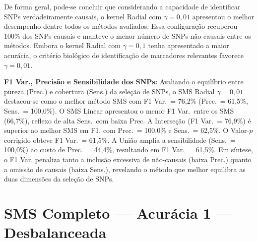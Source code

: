 \documentclass[
    12pt,
    a4paper,
    oneside,
    english,
    french,
    spanish,
    brazil
    ]{abntex2}
\newcommand{\novo}[1]{\textcolor{corNova}{#1}}
\begin{document}
De forma geral, pode-se concluir que considerando a capacidade de identificar SNPs verdadeiramente causais, o kernel Radial com $\gamma = 0{,}01$ apresentou o melhor desempenho dentre todos os métodos avaliados. Essa configuração recuperou 100\% dos SNPs causais e manteve o menor número de SNPs não causais entre os métodos. Embora o kernel Radial com $\gamma = 0{,}1$ tenha apresentado a maior acurácia, o critério biológico de identificação de marcadores relevantes favorece $\gamma = 0{,}01$.


\novo{\textbf{F1 Var., Precisão e Sensibilidade dos SNPs:} Avaliando o equilíbrio entre pureza (Prec.) e cobertura (Sens.) da seleção de SNPs, o SMS Radial $\gamma=0{,}01$ destacou-se como o melhor método SMS com F1 Var.\ = 76,2\% (Prec.\ = 61,5\%, Sens.\ = 100,0\%). O SMS Linear apresentou o menor F1 Var.\ entre os SMS (66,7\%), reflexo de alta Sens.\ com baixa Prec. A Interseção (F1 Var.\ = 76,9\%) é superior ao melhor SMS em F1, com Prec.\ = 100,0\% e Sens.\ = 62,5\%. O Valor-$p$ corrigido obteve F1 Var.\ = 61,5\%. A União amplia a sensibilidade (Sens.\ = 100,0\%) ao custo de Prec.\ = 44,4\%, resultando em F1 Var.\ = 61,5\%. Em síntese, o F1 Var. penaliza tanto a inclusão excessiva de não-causais (baixa Prec.) quanto a omissão de causais (baixa Sens.), revelando o método que melhor equilibra as duas dimensões da seleção de SNPs.}
\section{SMS Completo --- Acurácia 1 --- Desbalanceada}
\end{document}
